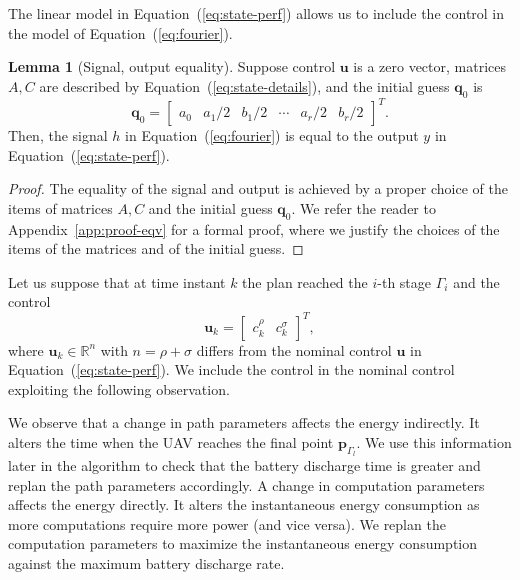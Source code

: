 \documentclass[letterpaper,10pt,conference]{ieeeconf}
\theoremstyle{definition}
\newtheorem{lem}[thm]{Lemma}
\begin{document}
The linear model in Equation~(\ref{eq:state-perf}) allows us to include the control in the model of Equation~(\ref{eq:fourier}).

\begin{lem}[Signal, output equality]\label{lem:eqv}Suppose control $\mathbf{u}$ is a zero vector, matrices $A,C$ are described by Equation~(\ref{eq:state-details}), and the initial guess $\mathbf{q}_0$ is 
  \begin{equation*}
  \mathbf{q}_0=\begin{bmatrix}a_0 & a_1/2 & b_1/2 & \cdots & a_r/2 & b_r/2\end{bmatrix}^T.
  \end{equation*} 
  Then, the signal $h$ in Equation~(\ref{eq:fourier}) is equal to the output $y$ in Equation~(\ref{eq:state-perf}).
\end{lem}
\begin{proof}
The equality of the signal and output is achieved by a proper choice of the items of matrices $A,C$ and the initial guess $\mathbf{q}_0$. We refer the reader to Appendix~\ref{app:proof-eqv} for a formal proof, where we justify the choices of the items of the matrices and of the initial guess. 
\end{proof}


Let us suppose that at time instant $k$ the plan reached the $i$-th stage $\Gamma_i$ and the control
\begin{equation}\label{eq:state-control2}
  \mathbf{u}_k=\begin{bmatrix}c_k^\rho & c_k^\sigma\end{bmatrix}^T,
\end{equation}
where $\mathbf{u}_k\in\mathbb{R}^n$ with $n=\rho+\sigma$ differs from the nominal control $\mathbf{u}$ in Equation~(\ref{eq:state-perf}). We include the control in the nominal control exploiting the following observation. 

We observe that a change in path parameters affects the energy indirectly. It alters the time when the UAV reaches the final point $\mathbf{p}_{\Gamma_l}$. We use this information later in the algorithm to check that the battery discharge time is greater and replan the path parameters accordingly. A change in computation parameters affects the energy directly. It alters the instantaneous energy consumption as more computations require more power (and vice versa). We replan the computation parameters to maximize the instantaneous energy consumption against the maximum battery discharge rate.
\end{document}
